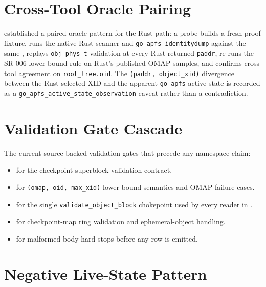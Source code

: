 \section{Cross-Tool Oracle Pairing}

established a paired oracle pattern for the Rust path: a probe builds a fresh
proof fixture, runs the native Rust scanner and \texttt{go-apfs identitydump}
against the same , replays \texttt{obj\_phys\_t} validation at
every Rust-returned \texttt{paddr}, re-runs the SR-006 lower-bound rule on
Rust's published OMAP samples, and confirms cross-tool agreement on
\texttt{root\_tree.oid}. The \texttt{(paddr, object\_xid)} divergence between
the Rust selected XID and the apparent \texttt{go-apfs} active state is recorded
as a \texttt{go\_apfs\_active\_state\_observation} caveat rather than a
contradiction.

\section{Validation Gate Cascade}

The current source-backed validation gates that precede any namespace claim:

\begin{itemize}
  \item {}
  for the checkpoint-superblock validation contract.
  \item {} for
  \texttt{(omap, oid, max\_xid)} lower-bound semantics and OMAP failure cases.
  \item {}
  for the single \texttt{validate\_object\_block} chokepoint used by every
  reader in .
  \item {} for
  checkpoint-map ring validation and ephemeral-object handling.
  \item {}
  for malformed-body hard stops before any row is emitted.
\end{itemize}

\section{Negative Live-State Pattern}

